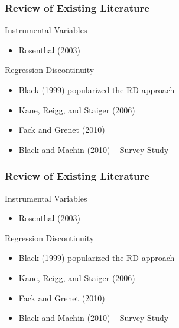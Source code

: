 \documentclass{beamer}
\begin{document}
\begin{frame}
\label{Literature Review}
\frametitle{Review of Existing Literature}
Instrumental Variables
\begin{itemize}
\item Rosenthal (2003)
\newline
\end{itemize}

Regression Discontinuity
\begin{itemize}
\item Black (1999) popularized the RD approach

\item Kane, Reigg, and Staiger (2006) 

\item Fack and Grenet (2010)

\item Black and Machin (2010) -- Survey Study 
\end{itemize}
\end{frame}

\begin{frame}
\label{Literature Review}
\frametitle{Review of Existing Literature}
Instrumental Variables
\begin{itemize}
\item Rosenthal (2003)
\newline
\end{itemize}

Regression Discontinuity
\begin{itemize}
\item Black (1999) popularized the RD approach

\item Kane, Reigg, and Staiger (2006) 

\item Fack and Grenet (2010)

\item Black and Machin (2010) -- Survey Study 
\end{itemize}
\end{frame}
\end{document}
